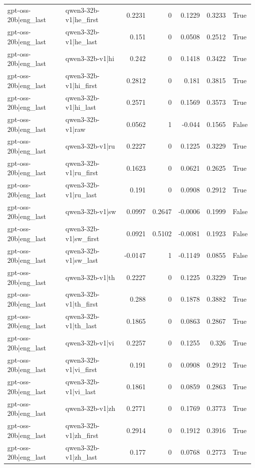 \begin{table}
\begin{tabular}{l l r r r r l}
gpt-oss-20b|eng_last & qwen3-32b-v1|he_first & 0.2231 & 0 & 0.1229 & 0.3233 & True \\
gpt-oss-20b|eng_last & qwen3-32b-v1|he_last & 0.151 & 0 & 0.0508 & 0.2512 & True \\
gpt-oss-20b|eng_last & qwen3-32b-v1|hi & 0.242 & 0 & 0.1418 & 0.3422 & True \\
gpt-oss-20b|eng_last & qwen3-32b-v1|hi_first & 0.2812 & 0 & 0.181 & 0.3815 & True \\
gpt-oss-20b|eng_last & qwen3-32b-v1|hi_last & 0.2571 & 0 & 0.1569 & 0.3573 & True \\
gpt-oss-20b|eng_last & qwen3-32b-v1|raw & 0.0562 & 1 & -0.044 & 0.1565 & False \\
gpt-oss-20b|eng_last & qwen3-32b-v1|ru & 0.2227 & 0 & 0.1225 & 0.3229 & True \\
gpt-oss-20b|eng_last & qwen3-32b-v1|ru_first & 0.1623 & 0 & 0.0621 & 0.2625 & True \\
gpt-oss-20b|eng_last & qwen3-32b-v1|ru_last & 0.191 & 0 & 0.0908 & 0.2912 & True \\
gpt-oss-20b|eng_last & qwen3-32b-v1|sw & 0.0997 & 0.2647 & -0.0006 & 0.1999 & False \\
gpt-oss-20b|eng_last & qwen3-32b-v1|sw_first & 0.0921 & 0.5102 & -0.0081 & 0.1923 & False \\
gpt-oss-20b|eng_last & qwen3-32b-v1|sw_last & -0.0147 & 1 & -0.1149 & 0.0855 & False \\
gpt-oss-20b|eng_last & qwen3-32b-v1|th & 0.2227 & 0 & 0.1225 & 0.3229 & True \\
gpt-oss-20b|eng_last & qwen3-32b-v1|th_first & 0.288 & 0 & 0.1878 & 0.3882 & True \\
gpt-oss-20b|eng_last & qwen3-32b-v1|th_last & 0.1865 & 0 & 0.0863 & 0.2867 & True \\
gpt-oss-20b|eng_last & qwen3-32b-v1|vi & 0.2257 & 0 & 0.1255 & 0.326 & True \\
gpt-oss-20b|eng_last & qwen3-32b-v1|vi_first & 0.191 & 0 & 0.0908 & 0.2912 & True \\
gpt-oss-20b|eng_last & qwen3-32b-v1|vi_last & 0.1861 & 0 & 0.0859 & 0.2863 & True \\
gpt-oss-20b|eng_last & qwen3-32b-v1|zh & 0.2771 & 0 & 0.1769 & 0.3773 & True \\
gpt-oss-20b|eng_last & qwen3-32b-v1|zh_first & 0.2914 & 0 & 0.1912 & 0.3916 & True \\
gpt-oss-20b|eng_last & qwen3-32b-v1|zh_last & 0.177 & 0 & 0.0768 & 0.2773 & True \\

\end{tabular}
\end{table}
